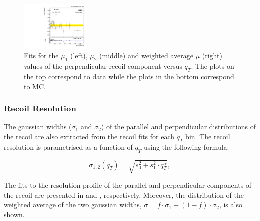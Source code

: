 \begin{figure}
\begin{center}
  \includegraphics[width=0.3\textwidth]{Figures/WBoson/Analysis/Correction/Recoil/RecoilFitsqT/MC/fitPFu2mean.pdf}
 \caption{Fits for the $\mu_{1}$ (left), $\mu_{2}$ (middle) and weighted average $\mu$ (right) values of the perpendicular recoil component versus $q_{T}$. The plots on the top correspond to data while the plots in the bottom correspond to \ZToMuMu MC.}
 \label{fig:figU2RecoilScaleFit}
 \end{center}
\end{figure}


\subsubsection{Recoil Resolution}\label{sec:WBoson_Corrections_MET_Rres}

The gaussian widths ($\sigma_{1}$ and $\sigma_{2}$) of the parallel and perpendicular distributions of the recoil are also extracted from the recoil fits for each $q_{T}$ bin. The recoil resolution is   parametrised as a function of $q_{T}$ using the following formula:

\begin{equation}\label{eq:equreolnparam} 
\sigma_{1,2}(q_{T}) = \sqrt{s_{0}^{2} + s_{1}^{2} \cdot q_{T}^{\alpha}},
\end{equation}

The fits to the resolution profile of the parallel and perpendicular components of the recoil are presented in  and  , respectively. Moreover, the distribution of the weighted average of the two gaussian widths, $\sigma = f \cdot \sigma_{1} + (1 - f) \cdot \sigma_{2}$, is also shown.

